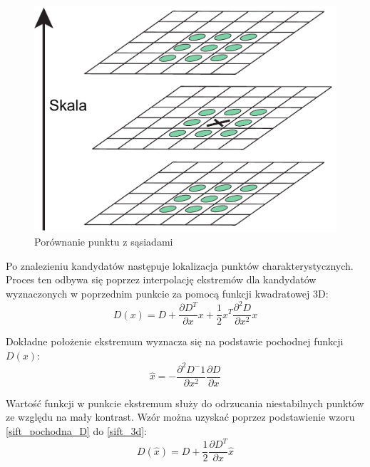\begin{figure}[h]
	\centering
	\includegraphics[scale=0.4]{graphics/01_podstawy_teoretyczne/sift-gaussian-min-max.pdf}
	\caption{Porównanie punktu z sąsiadami \cite{LOWE04}}
	\label{fig:sift-gaussian-min-max}
\end{figure}

Po znalezieniu kandydatów następuje lokalizacja punktów charakterystycznych. Proces ten odbywa się poprzez interpolację ekstremów dla kandydatów wyznaczonych w poprzednim punkcie za pomocą funkcji kwadratowej 3D:
\begin{equation} 
\label{sift_3d} 
D(x) = D + \frac{\partial D^T}{\partial x} x + \frac{1}{2}x^T \frac{\partial^2 D}{\partial x^2} x
\end{equation}

Dokładne położenie ekstremum wyznacza się na podstawie pochodnej funkcji $D(x)$:
\begin{equation} 
\label{sift_pochodna_D} 
\hat{x} = -\frac{\partial^2 D^-1}{\partial x^2}\frac{\partial D}{\partial x}
\end{equation}

Wartość funkcji w punkcie ekstremum służy do odrzucania niestabilnych punktów ze względu na mały kontrast. Wzór można uzyskać poprzez podstawienie wzoru \ref{sift_pochodna_D} do \ref{sift_3d}:
\begin{equation} 
\label{sift_Dx} 
D(\hat{x}) = D + \frac{1}{2} \frac{\partial D^T}{\partial x} \hat{x}
\end{equation}

